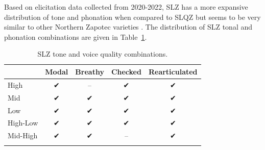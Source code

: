 

Based on elicitation data collected from 2020-2022, SLZ has a more expansive distribution of tone and phonation when compared to SLQZ but seems to be very similar to other Northern Zapotec varieties \citep[e.g.,][]{avelinobecerraTopicsYalalagZapotec2004}. The distribution of SLZ tonal and phonation combinations are given in Table~\ref{tab:ToneVoiceQuality}.
\begin{table}[!h]
	\caption{SLZ tone and voice quality combinations.}
	\label{tab:ToneVoiceQuality}
	\centering

	\begin{tabular}{lcccc}
	\lsptoprule
		& \textbf{Modal} & \textbf{Breathy} & \textbf{Checked} & \textbf{Rearticulated} \\
	\hline
	High		& ✔︎ & -- & ✔︎ & ✔︎ \\
	Mid			& ✔︎ & ✔︎ & ✔︎ & ✔︎ \\
	Low			& ✔︎ & ✔︎ & ✔︎ & ✔︎ \\
	High-Low	& ✔︎ & ✔︎ & ✔︎ & ✔︎ \\
	Mid-High	& ✔︎	& ✔︎ & -- & ✔︎ \\
	\lspbottomrule
	\end{tabular}
\end{table}

